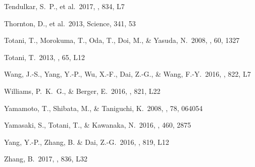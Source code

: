 \documentclass[]{pasj01}
\begin{document}
\begin{thebibliography}{10}
{Tendulkar}, S.~P., et al.\ 2017, \aplett, 834, L7

{Thornton}, D., et al.\ 2013, Science, 341, 53

{Totani}, T., {Morokuma}, T., {Oda}, T., {Doi}, M., \& {Yasuda}, N.\ 2008, \pasj, 60, 1327

Totani, T.\ 2013, \pasj, 65, L12


{Wang}, J.-S., {Yang}, Y.-P., {Wu}, X.-F., {Dai}, Z.-G., \& {Wang}, F.-Y.\ 2016, \aplett, 822, L7

{Williams}, P.~K.~G., \& {Berger}, E.\ 2016, \aplett, 821, L22

{Yamamoto}, T., {Shibata}, M., \& {Taniguchi}, K.\ 2008, \prd, 78, 064054

{Yamasaki}, S., {Totani}, T., \& {Kawanaka}, N.\ 2016, \mnras, 460, 2875

{Yang}, Y.-P., {Zhang}, B. \& {Dai}, Z.-G.\ 2016, \aplett, 819, L12


{Zhang}, B.\ 2017, \aplett, 836, L32

\end{thebibliography}
\end{document}
